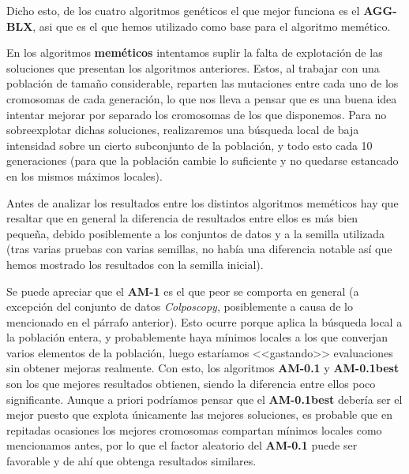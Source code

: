 \documentclass[size=a4, parskip=half, titlepage=false, toc=flat, toc=bib, 12pt]{scrartcl}
\begin{document}
Dicho esto, de los cuatro algoritmos genéticos el que mejor funciona es el \textbf{AGG-BLX}, asi que es el que hemos utilizado como base para el algoritmo memético.

En los algoritmos \textbf{meméticos} intentamos suplir la falta de explotación de las soluciones que presentan los algoritmos anteriores. Estos, al trabajar con una población de tamaño considerable, reparten las mutaciones entre cada uno de los cromosomas de cada generación, lo que nos lleva a pensar que es una buena idea intentar mejorar por separado los cromosomas de los que disponemos. Para no sobreexplotar dichas soluciones, realizaremos una búsqueda local de baja intensidad sobre un cierto subconjunto de la población, y todo esto cada 10 generaciones (para que la población cambie lo suficiente y no quedarse estancado en los mismos máximos locales).

Antes de analizar los resultados entre los distintos algoritmos meméticos hay que resaltar que en general la diferencia de resultados entre ellos es más bien pequeña, debido posiblemente a los conjuntos de datos y a la semilla utilizada (tras varias pruebas con varias semillas, no había una diferencia notable así que hemos mostrado los resultados con la semilla inicial).

Se puede apreciar que el \textbf{AM-1} es el que peor se comporta en general (a excepción del conjunto de datos \textit{Colposcopy}, posiblemente a causa de lo mencionado en el párrafo anterior). Esto ocurre porque aplica la búsqueda local a la población entera, y probablemente haya mínimos locales a los que converjan varios elementos de la población, luego estaríamos <<gastando>> evaluaciones sin obtener mejoras realmente. Con esto, los algoritmos \textbf{AM-0.1} y \textbf{AM-0.1best} son los que mejores resultados obtienen, siendo la diferencia entre ellos poco significante. Aunque a priori podríamos pensar que el \textbf{AM-0.1best} debería ser el mejor puesto que explota únicamente las mejores soluciones, es probable que en repitadas ocasiones los mejores cromosomas compartan mínimos locales como mencionamos antes, por lo que el factor aleatorio del \textbf{AM-0.1} puede ser favorable y de ahí que obtenga resultados similares.
\end{document}

